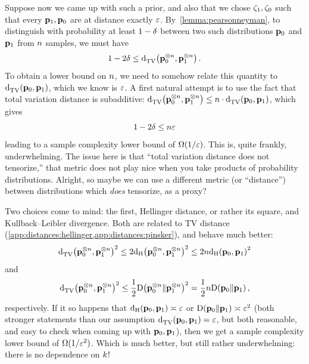 Suppose now we came up with such a prior, and also that we chose $\zeta_1,\zeta_0$ such that every $\mathbf{p}_1, \mathbf{p}_0$ are at distance exactly $\varepsilon$. By~\cref{lemma:pearsonneyman}, to distinguish with probability at least $1-\delta$ between two such distributions $\mathbf{p}_0$ and $\mathbf{p}_1$ from $n$ samples, we must have
\begin{equation}
	\label{eq:naive:distinguish}
	1- 2\errprob \leq \totalvardist{\p_0^{\otimes\ns}}{\p_1^{\otimes\ns}}\,.
\end{equation}
To obtain a lower bound on $n$, we need to somehow relate this quantity to $\totalvardist{\p_0}{\p_1}$, which we know is $\varepsilon$. A first natural attempt is to use the fact that total variation distance is subadditive: $\totalvardist{\p_0^{\otimes\ns}}{\p_1^{\otimes\ns}} \leq \ns \cdot \totalvardist{\p_0}{\p_1}$, which gives
\begin{equation}
	1- 2\delta \leq n\varepsilon
\end{equation}
leading to a sample complexity lower bound of $\Omega(1/\varepsilon)$. This is, quite frankly, underwhelming. The issue here is that ``total variation distance does not tensorize,'' \ie that metric does not play nice when you take products of probability distributions. Alright, so maybe we can use a different metric (or ``distance'') between distributions which \emph{does} tensorize, as a proxy?

Two choices come to mind: the first, Hellinger distance, or rather its square, and Kullback--Leibler divergence. Both are related to TV distance (\cref{app:distances:hellinger,app:distances:pinsker}), and behave much better:
\begin{equation}
	\totalvardist{\p_0^{\otimes\ns}}{\p_1^{\otimes\ns}}^2 \leq 2\hellinger{\p_0^{\otimes\ns}}{\p_1^{\otimes\ns}}^2 \leq 2\ns \hellinger{\p_0}{\p_1}^2
\end{equation}
and
\begin{equation}
	\totalvardist{\p_0^{\otimes\ns}}{\p_1^{\otimes\ns}}^2 \leq \frac{1}{2}\kldiv{\p_0^{\otimes\ns}}{\p_1^{\otimes\ns}}^2 = \frac{1}{2}\ns \kldiv{\p_0}{\p_1}\,,
\end{equation}
respectively. If it so happens that $\hellinger{\p_0}{\p_1}\asymp \dst$ or $\kldiv{\p_0}{\p_1}\asymp \dst^2$ (both stronger statements than our assumption $\totalvardist{\p_0}{\p_1}=\dst$, but both reasonable, and easy to check when coming up with $\mathbf{p}_0,\mathbf{p}_1$), then we get a sample complexity lower bound of $\Omega(1/\varepsilon^2)$. Which is much better, but still rather underwhelming: there is no dependence on $k$!

